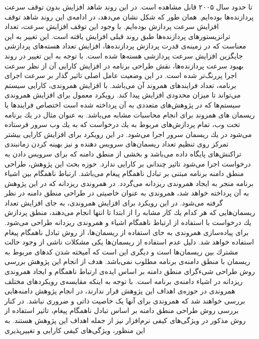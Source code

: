 تا حدود سال ۲۰۰۵ قابل مشاهده است. در این روند شاهد افزایش بدون توقف سرعت پردازنده‌ها بوده‌ایم. همان طور که شکل نشان می‌دهد، در ادامه‌ی این روند شاهد توقف افزایش سرعت پردازش بوده‌ایم. با وجود این توقف افزایش سرعت، تعداد ترانزیستور‌های پردازنده‌ها طبق روند قبلی افزایش یافته است. این تغییر به این معناست که در زمینه‌ی قدرت پردازش پردازنده‌ها، افزایش تعداد هسته‌های پردازشی جایگزین افزایش سرعت پردازشی هسته‌ها شده است. با توجه به این تغییر در روند بهبود سرعت پردازنده‌ها، نقش طراحی برنامه در افزایش كارایی آن از نظر سرعت اجرا پررنگ‌تر شده است. در این وضعیت عامل اصلی تاثیر گذار بر سرعت اجرای برنامه، تعداد فرایندهای همروند آن می‌باشد. با افزایش همروندی، كارایی سیستم می‌تواند تا میزان محدودی افزایش پیدا کند. رویكرد معمول برای افزایش همروندی سیستم‌ها كه در پژوهش‌های متعددی به آن پرداخته شده است اختصاص فرایندها یا ریسمان های همروند برای انجام محاسبات مشابه می‌باشد. به عنوان مثال در یك برنامه تحت وب، تمام پردازش‌های مربوط به یك درخواست كه به یك وب سرور فرستاده می‌شود در یك ریسمان سرور اجرا می‌شود. در این رویكرد برای افزایش كارایی بیشتر تمركز روی تنظیم تعداد ریسمان‌های سرویس دهنده و نیز بهینه كردن زمانبندی تراكنش‌های پایگاه داده می‌باشد و بخشی از منطق دامنه كه برای سرویس دادن به درخواست اجرا می‌شود تاثیر چندانی بر كارایی ندارد. حوزه بحث این پژوهش، طراحی منطق دامنه برنامه مبتنی بر تبادل ناهمگام پیغام می‌باشد. ارتباط ناهمگام بین اشیاء برنامه منجر به ایجاد همروندی ریزدانه می‌گردد. در همروندی ریزدانه كه در این پژوهش به آن پرداخته خواهد شد، همروندی به عنوان خاصیتی در طراحی منطق دامنه در نظر گرفته می‌شود. در این رویكرد برای افزایش همروندی، به جای افزایش تعداد ریسمان‌هایی كه هر كدام یك كار مشابه را از ابتدا تا انتها انجام می‌دهند، منطق پردازش یك درخواست با استفاده از ارتباط ناهمگام اشیاء و همروندی ریزدانه طراحی می‌شود. برای پیاده‌سازی همروندی به جای استفاده از ریسمان‌ها، از روش تبادل ناهمگام پیغام استفاده خواهد شد. دلیل عدم استفاده از ریسمان‌ها یكی مشكلات ناشی از وجود حالت مشترك 
بین ریسمان‌ها است و دیگری این است كه آمیخته شدن كدهای مربوط به ریسمان با منطق دامنه‌ی برنامه مطلوب نمی‌باشد. هدف از انجام این پژوهش بررسی روش طراحی شیءگرای منطق دامنه بر اساس ایده‌ی ارتباط ناهمگام و ایجاد همروندی ریزدانه در اشیاء دامنه‌ی برنامه است. با توجه به اینکه مقایسه‌ی رویکردهای مختلف همروندی در حوزه‌ی اهداف این پژوهش قرار ندارند، در انجام پژوهش دامنه‌هایی بررسی خواهند شد که همروندی برای آنها یک خاصیت ذاتی و ضروری نباشد. در کنار بررسی روش طراحی منطق دامنه بر اساس تبادل ناهمگام پیغام، تاثیر استفاده از روش مذکور در ویژگی‌های كیفی نرم‌افزار نیز از جمله اهداف این پژوهش هستند. به این منظور، ویژگی‌های كیفی كارایی
و تغییرپذیری

